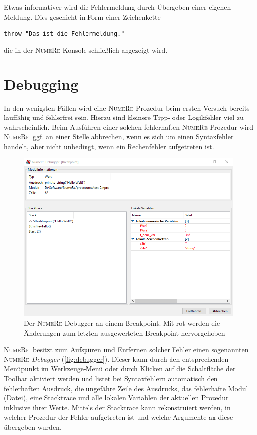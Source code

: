 \documentclass[DIV=14,headsepline,footsepline]{scrbook}
\newcommand{\NR}{\textsc{Nu\-me\-Re}}
\begin{document}
				Etwas informativer wird die Fehlermeldung durch Übergeben einer eigenen Meldung. Dies geschieht in Form einer Zeichenkette
				\begin{lstlisting}
throw "Das ist die Fehlermeldung."
				\end{lstlisting}
				die in der \NR-Konsole schließlich angezeigt wird.
			\section{Debugging}
				In den wenigsten Fällen wird eine \NR-Prozedur beim ersten Versuch bereits lauffähig und fehlerfrei sein. Hierzu sind kleinere Tipp- oder Logikfehler viel zu wahrscheinlich. Beim Ausführen einer solchen fehlerhaften \NR-Prozedur wird \NR\ ggf. an einer Stelle abbrechen, wenn es sich um einen Syntaxfehler handelt, aber nicht unbedingt, wenn ein Rechenfehler aufgetreten ist.
				\begin{figure}[htb]
					\centering
					\includegraphics[width=\textwidth]{_graphics/debugger.png}%
					\caption{Der \NR-Debugger an einem Breakpoint. Mit rot werden die Änderungen zum letzten ausgewerteten Breakpoint hervorgehoben}%
					\label{fig:debugger}%
				\end{figure}
				
				\NR\ besitzt zum Aufspüren und Entfernen solcher Fehler einen sogenannten \NR-\emph{Debugger} (\autoref{fig:debugger}). Dieser kann durch den entsprechenden Menüpunkt im Werkzeuge-Menü oder durch Klicken auf die Schaltfläche der Toolbar aktiviert werden und listet bei Syntaxfehlern automatisch den fehlerhaften Ausdruck, die ungefähre Zeile des Ausdrucks, das fehlerhafte Modul (Datei), eine Stacktrace und alle lokalen Variablen der aktuellen Prozedur inklusive ihrer Werte. Mittels der Stacktrace kann rekonstruiert werden, in welcher Prozedur der Fehler aufgetreten ist und welche Argumente an diese übergeben wurden.
				
\end{document}
